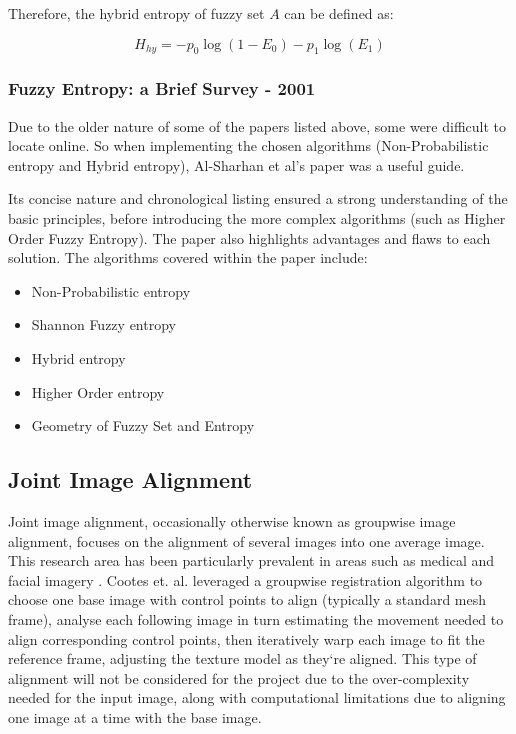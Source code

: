 Therefore, the hybrid entropy of fuzzy set $A$ can be defined as:

\begin{equation}
  H_{hy} = -p_0\log(1 - E_0) - p_1\log(E_1)
\end{equation}

\subsubsection{Fuzzy Entropy: a Brief Survey - 2001}

Due to the older nature of some of the papers listed above, some were difficult to locate online. So when implementing the chosen algorithms (Non-Probabilistic entropy and Hybrid entropy), Al-Sharhan et al's paper  \cite{Al-Sharhan_Karray_Gueaieb_Basir_2001} was a useful guide.

Its concise nature and chronological listing ensured a strong understanding of the basic principles, before introducing the more complex algorithms (such as Higher Order Fuzzy Entropy). The paper also highlights advantages and flaws to each solution. The algorithms covered within the paper include:

\begin{itemize}
  \item Non-Probabilistic entropy
  \item Shannon Fuzzy entropy
  \item Hybrid entropy
  \item Higher Order entropy
  \item Geometry of Fuzzy Set and Entropy
\end{itemize}

\subsection{Joint Image Alignment}

Joint image alignment, occasionally otherwise known as groupwise image alignment, focuses on the alignment of several images into one average image. This research area has been particularly prevalent in areas such as medical and facial imagery \cite{Tiddeman_Hunter_2011} \cite{Cootes_Twining_Petrovic_Babalola_Taylor_2010}. Cootes et. al. leveraged a groupwise registration algorithm to choose one base image with control points to align (typically a standard mesh frame), analyse each following image in turn estimating the movement needed to align corresponding control points, then iteratively warp each image to fit the reference frame, adjusting the texture model as they`re aligned. This type of alignment will not be considered for the project due to the over-complexity needed for the input image, along with computational limitations due to aligning one image at a time with the base image.

